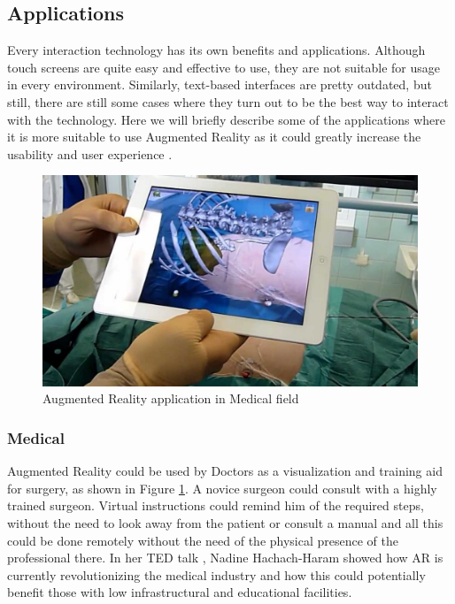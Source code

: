 \subsection{Applications}
Every interaction technology has its own benefits and applications. Although touch screens are quite easy and effective to use, they are not suitable for usage in every environment. Similarly, text-based interfaces are pretty outdated, but still, there are still some cases where they turn out to be the best way to interact with the technology.
Here we will briefly describe some of the applications where it is more suitable to use Augmented Reality as it could greatly increase the usability and user experience \cite{azuma1997survey}.

\begin{figure}
    \centering
        \includegraphics[width=1.00\textwidth]{images/mobile_ar_medical.jpg}
    \caption{Augmented Reality application in Medical field}
    \label{fig:ar_medical}
\end{figure}

\subsubsection{Medical}
Augmented Reality could be used by Doctors as a visualization and training aid for surgery, as shown in Figure \ref{fig:ar_medical}. A novice surgeon could consult with a highly trained surgeon. Virtual instructions could remind him of the required steps, without the need to look away from the patient or consult a manual and all this could be done remotely without the need of the physical presence of the professional there. In her TED talk \cite{Hachach-Haram2017}, Nadine Hachach-Haram showed how AR is currently revolutionizing the medical industry and how this could potentially benefit those with low infrastructural and educational facilities.


